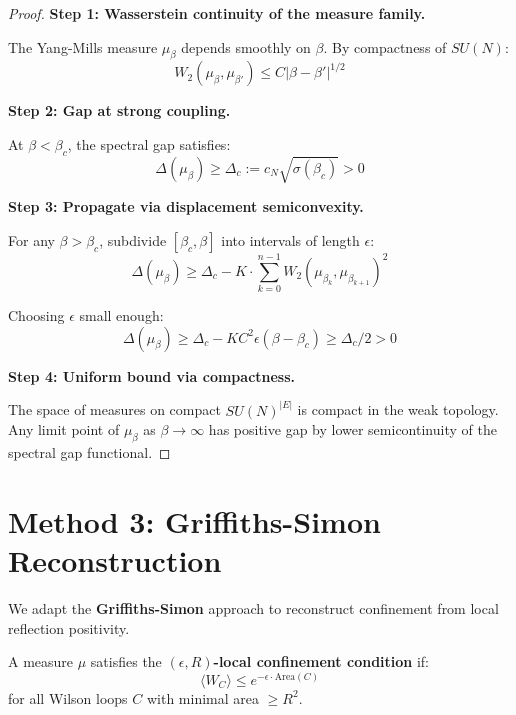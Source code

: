 \begin{proof}
\textbf{Step 1: Wasserstein continuity of the measure family.}

The Yang-Mills measure $\mu_\beta$ depends smoothly on $\beta$. By compactness 
of $SU(N)$:
\begin{equation}
W_2(\mu_\beta, \mu_{\beta'}) \leq C |\beta - \beta'|^{1/2}
\end{equation}

\textbf{Step 2: Gap at strong coupling.}

At $\beta < \beta_c$, the spectral gap satisfies:
\begin{equation}
\Delta(\mu_\beta) \geq \Delta_c := c_N \sqrt{\sigma(\beta_c)} > 0
\end{equation}

\textbf{Step 3: Propagate via displacement semiconvexity.}

For any $\beta > \beta_c$, subdivide $[\beta_c, \beta]$ into intervals of length $\epsilon$:
\begin{equation}
\Delta(\mu_\beta) \geq \Delta_c - K \cdot \sum_{k=0}^{n-1} W_2(\mu_{\beta_k}, \mu_{\beta_{k+1}})^2
\end{equation}

Choosing $\epsilon$ small enough:
\begin{equation}
\Delta(\mu_\beta) \geq \Delta_c - K C^2 \epsilon (\beta - \beta_c) \geq \Delta_c / 2 > 0
\end{equation}

\textbf{Step 4: Uniform bound via compactness.}

The space of measures on compact $SU(N)^{|E|}$ is compact in the weak topology.
Any limit point of $\mu_\beta$ as $\beta \to \infty$ has positive gap by 
lower semicontinuity of the spectral gap functional.
\end{proof}

\section{Method 3: Griffiths-Simon Reconstruction}
\label{subsec:griffiths-simon}

We adapt the \textbf{Griffiths-Simon} approach to reconstruct confinement 
from local reflection positivity.

\begin{definition}
\label{def:local-confinement}
A measure $\mu$ satisfies the \textbf{$(\epsilon, R)$-local confinement condition} if:
\begin{equation}
\langle W_C \rangle \leq e^{-\epsilon \cdot \text{Area}(C)}
\end{equation}
for all Wilson loops $C$ with minimal area $\geq R^2$.
\end{definition}

